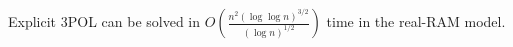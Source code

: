 \begin{contribution}[label=thm:explicit:uniform,restate=TheoremPOLUniformExplicit]
Explicit 3POL can be solved in
$O(\frac{n^2 {(\log \log n)}^{3/2}}{{(\log n)}^{1/2}})$
time in the real-RAM model.
\end{contribution}

